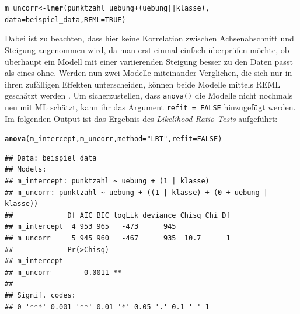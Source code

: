 \documentclass[12pt]{article}\usepackage[]{graphicx}\usepackage[]{color}
\makeatletter
\newcommand{\hlnum}[1]{\textcolor[rgb]{0.686,0.059,0.569}{#1}}%
\newcommand{\hlstr}[1]{\textcolor[rgb]{0.192,0.494,0.8}{#1}}%
\newcommand{\hlopt}[1]{\textcolor[rgb]{0,0,0}{#1}}%
\newcommand{\hlstd}[1]{\textcolor[rgb]{0.345,0.345,0.345}{#1}}%
\newcommand{\hlkwb}[1]{\textcolor[rgb]{0.69,0.353,0.396}{#1}}%
\newcommand{\hlkwc}[1]{\textcolor[rgb]{0.333,0.667,0.333}{#1}}%
\newcommand{\hlkwd}[1]{\textcolor[rgb]{0.737,0.353,0.396}{\textbf{#1}}}%
\newenvironment{kframe}{%
 \def\at@end@of@kframe{}%
 \ifinner\ifhmode%
  \def\at@end@of@kframe{\end{minipage}}%
  \begin{minipage}{\columnwidth}%
 \fi\fi%
 \def\FrameCommand##1{\hskip\@totalleftmargin \hskip-\fboxsep
 \colorbox{shadecolor}{##1}\hskip-\fboxsep
     \hskip-\linewidth \hskip-\@totalleftmargin \hskip\columnwidth}%
 \MakeFramed {\advance\hsize-\width
   \@totalleftmargin\z@ \linewidth\hsize
   \@setminipage}}%
 {\par\unskip\endMakeFramed%
 \at@end@of@kframe}
\newenvironment{knitrout}{}{} %
\makeatother
\begin{document}
\singlespacing
\begin{knitrout}
\color{fgcolor}\begin{kframe}
\begin{alltt}
\hlstd{m_uncorr} \hlkwb{<-} \hlkwd{lmer}\hlstd{(punktzahl} \hlopt{~} \hlstd{uebung} \hlopt{+} \hlstd{(uebung} \hlopt{||} \hlstd{klasse),}
        \hlkwc{data} \hlstd{= beispiel_data,} \hlkwc{REML} \hlstd{=} \hlnum{TRUE}\hlstd{)}
\end{alltt}
\end{kframe}
\end{knitrout}

Dabei ist zu beachten, dass hier keine Korrelation zwischen Achsenabschnitt und Steigung angenommen wird, da man erst einmal einfach überprüfen möchte, ob überhaupt ein Modell mit einer variierenden Steigung besser zu den Daten passt als eines ohne. Werden nun zwei Modelle miteinander Verglichen, die sich nur in ihren zufälligen Effekten unterscheiden, können beide Modelle mittels REML geschätzt werden \citep{PEUGH201085}. Um sicherzustellen, dass \texttt{anova()} die Modelle nicht nochmals neu mit ML schätzt, kann ihr das Argument \texttt{refit = FALSE} hinzugefügt werden. Im folgenden Output ist das Ergebnis des \textit{Likelihood Ratio Tests} aufgeführt:

\singlespacing
\begin{knitrout}
\color{fgcolor}\begin{kframe}
\begin{alltt}
\hlkwd{anova}\hlstd{(m_intercept, m_uncorr,} \hlkwc{method} \hlstd{=} \hlstr{"LRT"}\hlstd{,} \hlkwc{refit} \hlstd{=} \hlnum{FALSE}\hlstd{)}
\end{alltt}
\begin{verbatim}
## Data: beispiel_data
## Models:
## m_intercept: punktzahl ~ uebung + (1 | klasse)
## m_uncorr: punktzahl ~ uebung + ((1 | klasse) + (0 + uebung | klasse))
##             Df AIC BIC logLik deviance Chisq Chi Df
## m_intercept  4 953 965   -473      945             
## m_uncorr     5 945 960   -467      935  10.7      1
##             Pr(>Chisq)   
## m_intercept              
## m_uncorr        0.0011 **
## ---
## Signif. codes:  
## 0 '***' 0.001 '**' 0.01 '*' 0.05 '.' 0.1 ' ' 1
\end{verbatim}
\end{kframe}
\end{knitrout}
\end{document}
